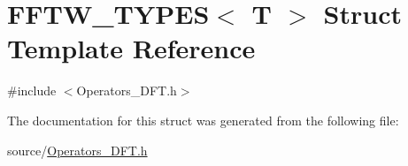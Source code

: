 \hypertarget{struct_f_f_t_w___t_y_p_e_s}{}\section{F\+F\+T\+W\+\_\+\+T\+Y\+P\+E\+S$<$ T $>$ Struct Template Reference}
\label{struct_f_f_t_w___t_y_p_e_s}


{\ttfamily \#include $<$Operators\+\_\+\+D\+F\+T.\+h$>$}



The documentation for this struct was generated from the following file\+:\begin{DoxyCompactItemize}
\item 
source/\hyperlink{_operators___d_f_t_8h}{Operators\+\_\+\+D\+F\+T.\+h}\end{DoxyCompactItemize}
